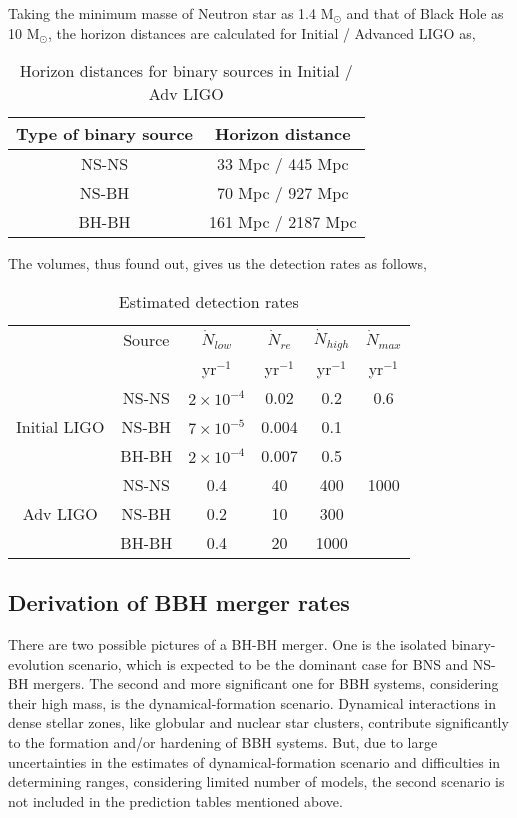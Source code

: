 \documentclass{article}
\numberwithin{equation}{section}
\begin{document}
Taking the minimum masse of Neutron star as 1.4 M$_\odot$ and that of Black Hole as 10 M$_\odot$, the horizon distances are calculated for Initial / Advanced LIGO as,

\begin{table}[h!]
	\centering
	\caption{Horizon distances for binary sources in Initial / Adv LIGO}
	\label{tab:table2}
	\begin{tabular}{cc}
		\toprule
		Type of binary source & Horizon distance\\
		\midrule
		NS-NS & 33 Mpc / 445 Mpc\\
		NS-BH & 70 Mpc / 927 Mpc\\
		BH-BH & 161 Mpc / 2187 Mpc\\
		\bottomrule
	\end{tabular}
\end{table}

The volumes, thus found out, gives us the detection rates as follows,

\begin{table}[h!]
	\centering
	\caption{Estimated detection rates}
	\label{tab:table3}
	\begin{tabular}{cccccc}
		\toprule
		 & Source & $\dot{N}_{low}$ & $\dot{N}_{re}$ & $\dot{N}_{high}$ & $\dot{N}_{max}$\\
		 & & yr$^{-1}$ & yr$^{-1}$ & yr$^{-1}$ & yr$^{-1}$\\
		
		\midrule
		 & NS-NS & $2 \times 10^{-4}$ & 0.02 & 0.2 & 0.6\\
		Initial LIGO & NS-BH & $7 \times 10^{-5}$ & 0.004 & 0.1 & \\
		 & BH-BH & $2 \times 10^{-4}$ & 0.007 & 0.5 & \\
		
		\midrule
		& NS-NS & 0.4 & 40 & 400 & 1000\\
		Adv LIGO & NS-BH & 0.2 & 10 & 300 & \\
		& BH-BH & 0.4 & 20 & 1000 & \\
		\bottomrule
	\end{tabular}
\end{table}

\subsection*{\normalsize{Derivation of BBH merger rates}}
There are two possible pictures of a BH-BH merger. One is the isolated binary-evolution scenario, which is expected to be the dominant case for BNS and NS-BH mergers. The second and more significant one for BBH systems, considering their high mass, is the dynamical-formation scenario. Dynamical interactions in dense stellar zones, like globular and nuclear star clusters, contribute significantly to the formation and/or hardening of BBH systems. But, due to large uncertainties in the estimates of dynamical-formation scenario and difficulties in determining ranges, considering limited number of models, the second scenario is not included in the prediction tables mentioned above.
\end{document}
